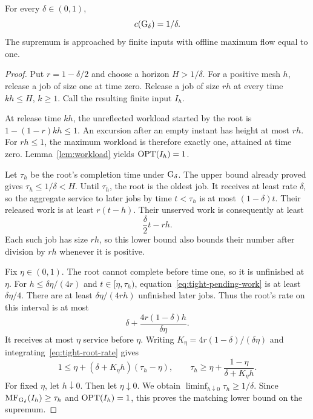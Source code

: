 \begin{theorem}\label{thm:guard-tight}
For every $\delta\in(0,1)$,
\begin{equation}\label{eq:guard-tight}
 c(\operatorname{G}_\delta)=1/\delta.
\end{equation}
The supremum is approached by finite inputs with offline maximum flow equal to one.
\end{theorem}
\begin{proof}
Put $r=1-\delta/2$ and choose a horizon $H>1/\delta$. For a positive mesh $h$, release a job of size one at time zero. Release a job of size $rh$ at every time $kh\leq H$, $k\geq1$. Call the resulting finite input $I_h$.

At release time $kh$, the unreflected workload started by the root is $1-(1-r)kh\leq1$. An excursion after an empty instant has height at most $rh$. For $rh\leq1$, the maximum workload is therefore exactly one, attained at time zero. Lemma~\ref{lem:workload} yields $\operatorname{OPT}(I_h)=1$.

Let $\tau_h$ be the root's completion time under $\operatorname{G}_\delta$. The upper bound already proved gives $\tau_h\leq1/\delta<H$. Until $\tau_h$, the root is the oldest job. It receives at least rate $\delta$, so the aggregate service to later jobs by time $t<\tau_h$ is at most $(1-\delta)t$. Their released work is at least $r(t-h)$. Their unserved work is consequently at least
\begin{equation}\label{eq:tight-pending-work}
 \frac\delta2t-rh.
\end{equation}
Each such job has size $rh$, so this lower bound also bounds their number after division by $rh$ whenever it is positive.

Fix $\eta\in(0,1)$. The root cannot complete before time one, so it is unfinished at $\eta$. For $h\leq\delta\eta/(4r)$ and $t\in[\eta,\tau_h)$, equation~\eqref{eq:tight-pending-work} is at least $\delta\eta/4$. There are at least $\delta\eta/(4rh)$ unfinished later jobs. Thus the root's rate on this interval is at most
\begin{equation}\label{eq:tight-root-rate}
 \delta+\frac{4r(1-\delta)h}{\delta\eta}.
\end{equation}
It receives at most $\eta$ service before $\eta$. Writing $K_\eta=4r(1-\delta)/(\delta\eta)$ and integrating~\eqref{eq:tight-root-rate} gives
\[
 1\leq\eta+(\delta+K_\eta h)(\tau_h-\eta),
 \qquad
 \tau_h\geq\eta+\frac{1-\eta}{\delta+K_\eta h}.
\]
For fixed $\eta$, let $h\downarrow0$. Then let $\eta\downarrow0$. We obtain $\liminf_{h\downarrow0}\tau_h\geq1/\delta$. Since $\operatorname{MF}_{\operatorname{G}_\delta}(I_h)\geq\tau_h$ and $\operatorname{OPT}(I_h)=1$, this proves the matching lower bound on the supremum.
\end{proof}

